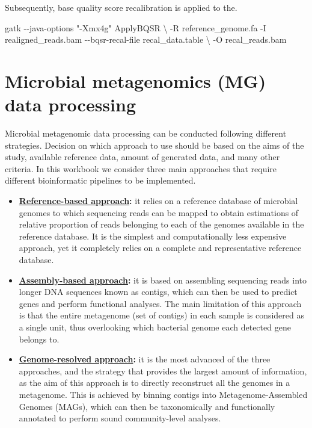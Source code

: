 \documentclass[
]{book}
\newenvironment{Shaded}{\begin{snugshade}}{\end{snugshade}}
\newcommand{\AttributeTok}[1]{\textcolor[rgb]{0.77,0.63,0.00}{#1}}
\newcommand{\DataTypeTok}[1]{\textcolor[rgb]{0.13,0.29,0.53}{#1}}
\newcommand{\ExtensionTok}[1]{#1}
\newcommand{\NormalTok}[1]{#1}
\newcommand{\StringTok}[1]{\textcolor[rgb]{0.31,0.60,0.02}{#1}}
\providecommand{\tightlist}{%
  \setlength{\itemsep}{0pt}\setlength{\parskip}{0pt}}
\begin{document}
\normalsize

Subsequently, base quality score recalibration is applied to the.
\small

\begin{Shaded}
\begin{Highlighting}[]
\ExtensionTok{gatk} \AttributeTok{{-}{-}java{-}options} \StringTok{"{-}Xmx4g"}\NormalTok{ ApplyBQSR }\DataTypeTok{\textbackslash{}}
    \AttributeTok{{-}R}\NormalTok{ reference\_genome.fa}
    \ExtensionTok{{-}I}\NormalTok{ realigned\_reads.bam}
    \ExtensionTok{{-}{-}bqsr{-}recal{-}file}\NormalTok{ recal\_data.table }\DataTypeTok{\textbackslash{}}
    \AttributeTok{{-}O}\NormalTok{ recal\_reads.bam}
\end{Highlighting}
\end{Shaded}

\normalsize

\hypertarget{microbial-metagenomics-data-processing}{%
\chapter{Microbial metagenomics (MG) data processing}\label{microbial-metagenomics-data-processing}}

Microbial metagenomic data processing can be conducted following different strategies. Decision on which approach to use should be based on the aims of the study, available reference data, amount of generated data, and many other criteria. In this workbook we consider three main approaches that require different bioinformatic pipelines to be implemented.

\begin{itemize}
\tightlist
\item
  \textbf{\protect\hyperlink{reference-based}{Reference-based approach}:} it relies on a reference database of microbial genomes to which sequencing reads can be mapped to obtain estimations of relative proportion of reads belonging to each of the genomes available in the reference database. It is the simplest and computationally less expensive approach, yet it completely relies on a complete and representative reference database.
\item
  \textbf{\protect\hyperlink{assembly-based}{Assembly-based approach}:} it is based on assembling sequencing reads into longer DNA sequences known as contigs, which can then be used to predict genes and perform functional analyses. The main limitation of this approach is that the entire metagenome (set of contigs) in each sample is considered as a single unit, thus overlooking which bacterial genome each detected gene belongs to.
\item
  \textbf{\protect\hyperlink{genome-resolved}{Genome-resolved approach}:} it is the most advanced of the three approaches, and the strategy that provides the largest amount of information, as the aim of this approach is to directly reconstruct all the genomes in a metagenome. This is achieved by binning contigs into Metagenome-Assembled Genomes (MAGs), which can then be taxonomically and functionally annotated to perform sound community-level analyses.
\end{itemize}
\end{document}

